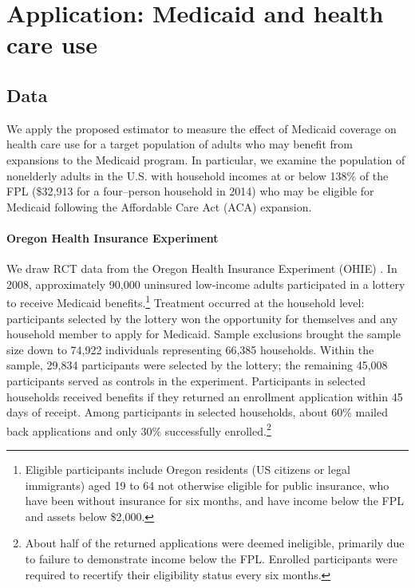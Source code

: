 \documentclass[12pt]{article}
\begin{document}

\section{Application: Medicaid and health care use}
\subsection{Data} \label{data}

We apply the proposed estimator to measure the effect of Medicaid coverage on health care use for a target population of adults who may benefit from expansions to the Medicaid program. In particular, we examine the population of nonelderly adults in the U.S. with household incomes at or below 138\% of the FPL (\$32,913 for a four--person household in 2014) who may be eligible for Medicaid following the Affordable Care Act (ACA) expansion.

\paragraph{Oregon Health Insurance Experiment}

We draw RCT data from the Oregon Health Insurance Experiment (OHIE) \citep{finkelstein2012,baicker2013,baicker2014,Taubman}.  In 2008, approximately 90,000 uninsured low-income adults participated in a lottery to receive Medicaid benefits.\footnote{Eligible participants include Oregon residents (US citizens or legal immigrants) aged 19 to 64 not otherwise eligible for public insurance, who have been without insurance for six months, and have income below the FPL and assets below \$2,000.} Treatment occurred at the household level: participants selected by the lottery won the opportunity for themselves and any household member to apply for Medicaid. Sample exclusions brought the sample size down to 74,922 individuals representing 66,385 households.  Within the sample, 29,834 participants were selected by the lottery; the remaining 45,008 participants served as controls in the experiment.  Participants in selected households received benefits if they returned an enrollment application within 45 days of receipt. Among participants in selected households, about 60\% mailed back applications and only 30\% successfully enrolled.\footnote{About half of the returned applications were deemed ineligible, primarily due to failure to demonstrate income below the FPL. Enrolled participants were required to recertify their eligibility status every six months.}  
\end{document}
